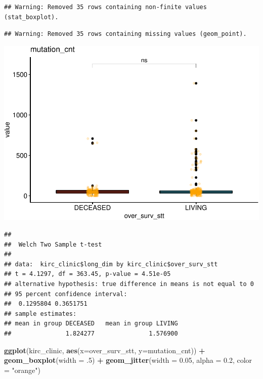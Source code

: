 \documentclass[]{article}
\newenvironment{Shaded}{\begin{snugshade}}{\end{snugshade}}
\newcommand{\KeywordTok}[1]{\textcolor[rgb]{0.13,0.29,0.53}{\textbf{#1}}}
\newcommand{\DataTypeTok}[1]{\textcolor[rgb]{0.13,0.29,0.53}{#1}}
\newcommand{\DecValTok}[1]{\textcolor[rgb]{0.00,0.00,0.81}{#1}}
\newcommand{\FloatTok}[1]{\textcolor[rgb]{0.00,0.00,0.81}{#1}}
\newcommand{\StringTok}[1]{\textcolor[rgb]{0.31,0.60,0.02}{#1}}
\newcommand{\OperatorTok}[1]{\textcolor[rgb]{0.81,0.36,0.00}{\textbf{#1}}}
\newcommand{\NormalTok}[1]{#1}
\begin{document}
\begin{verbatim}
## Warning: Removed 35 rows containing non-finite values (stat_boxplot).
\end{verbatim}

\begin{verbatim}
## Warning: Removed 35 rows containing missing values (geom_point).
\end{verbatim}

\includegraphics{figs/render-unnamed-chunk-12-5.pdf}

\begin{Shaded}
\end{Shaded}

\begin{verbatim}
## 
##  Welch Two Sample t-test
## 
## data:  kirc_clinic$long_dim by kirc_clinic$over_surv_stt
## t = 4.1297, df = 363.45, p-value = 4.51e-05
## alternative hypothesis: true difference in means is not equal to 0
## 95 percent confidence interval:
##  0.1295804 0.3651751
## sample estimates:
## mean in group DECEASED   mean in group LIVING 
##               1.824277               1.576900
\end{verbatim}

\begin{Shaded}
\begin{Highlighting}[]
\KeywordTok{ggplot}\NormalTok{(kirc_clinic, }\KeywordTok{aes}\NormalTok{(}\DataTypeTok{x=}\NormalTok{over_surv_stt, }\DataTypeTok{y=}\NormalTok{mutation_cnt)) }\OperatorTok{+}
\StringTok{  }\KeywordTok{geom_boxplot}\NormalTok{(}\DataTypeTok{width =}\NormalTok{ .}\DecValTok{5}\NormalTok{) }\OperatorTok{+}
\StringTok{  }\KeywordTok{geom_jitter}\NormalTok{(}\DataTypeTok{width =} \FloatTok{0.05}\NormalTok{, }\DataTypeTok{alpha =} \FloatTok{0.2}\NormalTok{, }\DataTypeTok{color =} \StringTok{"orange"}\NormalTok{)}
\end{Highlighting}
\end{Shaded}
\end{document}
